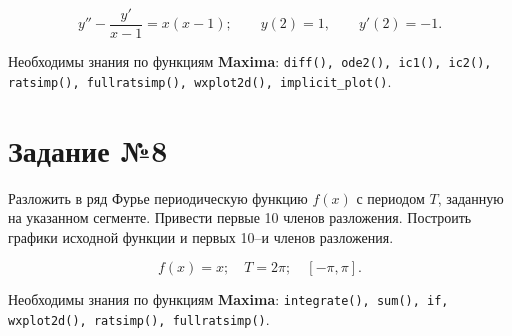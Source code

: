     \[
        y'' - \frac{y'}{x - 1} = x (x - 1); \qquad y(2) = 1, \qquad y'(2) = -1.
    \]

    Необходимы знания по функциям \textbf{Maxima}: {\tt diff(), ode2(), ic1(), ic2(), ratsimp(), fullratsimp(), wxplot2d(), implicit\_plot()}.

\section*{Задание №8}

    Разложить в ряд Фурье периодическую функцию $f(x)$ с периодом $T$, заданную на указанном сегменте. Привести первые 10 членов разложения. Построить графики исходной функции и первых 10--и членов разложения.

    \[
        f(x) = x; \quad T = 2 \pi; \quad [-\pi, \pi].
    \]

    Необходимы знания по функциям \textbf{Maxima}: {\tt integrate(), sum(), if, wxplot2d(), ratsimp(), fullratsimp()}.

    \newpage